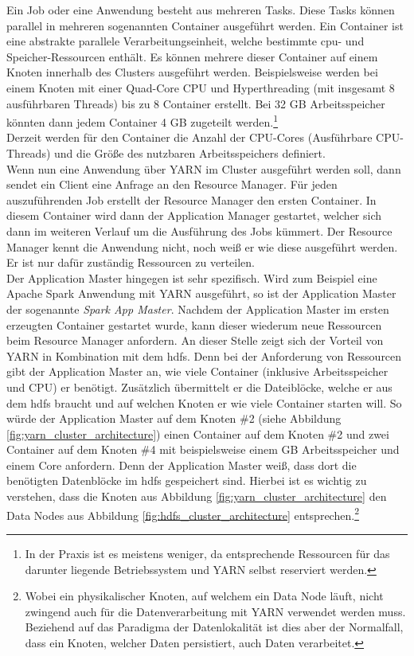 \noindent
Ein Job oder eine Anwendung besteht aus mehreren Tasks. Diese Tasks können parallel in mehreren sogenannten Container ausgeführt werden. Ein Container ist eine abstrakte parallele Verarbeitungseinheit, welche bestimmte \acrshort{cpu}- und Speicher-Ressourcen enthält. Es können mehrere dieser Container auf einem Knoten innerhalb des Clusters ausgeführt werden. Beispielsweise werden bei einem Knoten mit einer Quad-Core CPU und Hyperthreading (mit insgesamt 8 ausführbaren Threads) bis zu 8 Container erstellt. Bei 32 GB Arbeitsspeicher könnten dann jedem Container 4 GB zugeteilt werden.\footnote{In der Praxis ist es meistens weniger, da entsprechende Ressourcen für das darunter liegende Betriebssystem und YARN selbst reserviert werden.}\\
Derzeit werden für den Container die Anzahl der CPU-Cores (Ausführbare CPU-Threads) und die Größe des nutzbaren Arbeitsspeichers definiert.\cite[S. 48 ff.]{expert_hadoop_admin}\\

\noindent
Wenn nun eine Anwendung über YARN im Cluster ausgeführt werden soll, dann sendet ein Client eine Anfrage an den Resource Manager. 
Für jeden auszuführenden Job erstellt der Resource Manager den ersten Container. In diesem Container wird dann der Application Manager gestartet, welcher sich dann im weiteren Verlauf um die Ausführung des Jobs kümmert. Der Resource Manager kennt die Anwendung nicht, noch weiß er wie diese ausgeführt werden. 
Er ist nur dafür zuständig Ressourcen zu verteilen.\\ 
Der Application Master hingegen ist sehr spezifisch. Wird zum Beispiel eine Apache Spark Anwendung mit YARN ausgeführt, so ist der Application Master der sogenannte \textit{Spark App Master}. Nachdem der Application Master im ersten erzeugten Container gestartet wurde, kann dieser wiederum neue Ressourcen beim Resource Manager anfordern. 
An dieser Stelle zeigt sich der Vorteil von YARN in Kombination mit dem \gls{hdfs}. Denn bei der Anforderung von Ressourcen gibt der Application Master an, wie viele Container (inklusive Arbeitsspeicher und CPU) er benötigt. Zusätzlich übermittelt er die Dateiblöcke, welche er aus dem \gls{hdfs} braucht und auf welchen Knoten er wie viele Container starten will. So würde der Application Master auf dem Knoten \#2 (siehe Abbildung \ref{fig:yarn_cluster_architecture}) einen Container auf dem Knoten \#2 und zwei Container auf dem Knoten \#4 mit beispielsweise einem GB Arbeitsspeicher und einem Core anfordern. 
Denn der Application Master weiß, dass dort die benötigten Datenblöcke im \gls{hdfs} gespeichert sind. Hierbei ist es wichtig zu verstehen, dass die Knoten aus Abbildung \ref{fig:yarn_cluster_architecture} den Data Nodes aus Abbildung \ref{fig:hdfs_cluster_architecture} entsprechen.\footnote{Wobei ein physikalischer Knoten, auf welchem ein Data Node läuft, nicht zwingend auch für die Datenverarbeitung mit YARN verwendet werden muss. Beziehend auf das Paradigma der Datenlokalität ist dies aber der Normalfall, dass ein Knoten, welcher Daten persistiert, auch Daten verarbeitet.}\\

